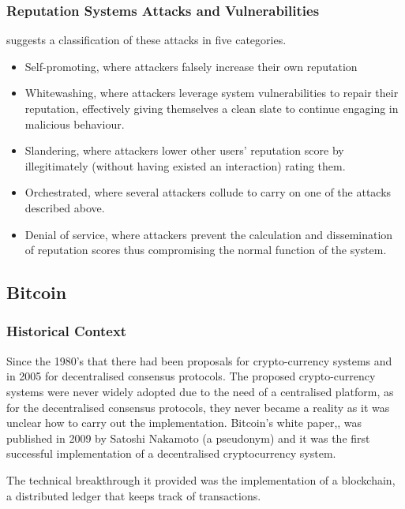 \documentclass[llncsdoc]{llncs}
\begin{document}
\subsubsection{Reputation Systems Attacks and Vulnerabilities}
\cite{Hoffman:2009gm} suggests a classification of these attacks in five categories. 
\begin{itemize}
     

\item Self-promoting, where attackers falsely increase their own reputation
\item Whitewashing, where attackers leverage system vulnerabilities to repair their reputation, effectively giving themselves a clean slate to continue engaging in malicious behaviour.
\item Slandering, where attackers lower other users' reputation score by illegitimately (without having existed an interaction) rating them.
\item Orchestrated, where several attackers collude to carry on one of the attacks described above.
\item Denial of service, where attackers prevent the calculation and dissemination of reputation scores thus compromising the normal function of the system.
\end{itemize}

\subsection{Bitcoin}

\subsubsection{Historical Context}

 Since the 1980's that there had been proposals for crypto-currency systems and in 2005 for decentralised consensus protocols. The proposed crypto-currency systems were never widely adopted due to the need of a centralised platform, as for the decentralised consensus protocols, they never became a reality as it was unclear how to carry out the implementation.
 Bitcoin's white paper,\cite{Anonymous:JOJGrvgg}, was published in 2009 by Satoshi Nakamoto (a pseudonym) and it was the first successful implementation of a decentralised cryptocurrency system.
 
 The technical breakthrough it provided was the implementation of a blockchain, a distributed ledger that keeps track of transactions. 
\end{document}
